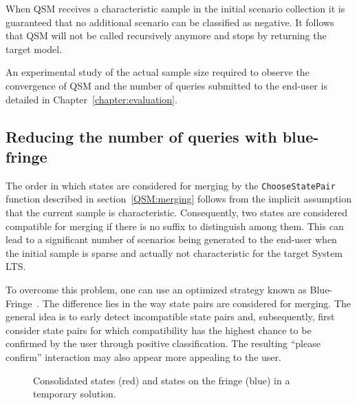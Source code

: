 When QSM receives a characteristic sample in the initial scenario collection it is guaranteed that no additional scenario can be classified as negative. It follows that QSM will not be called recursively anymore and stops by returning the target model. 

An experimental study of the actual sample size required to observe the convergence of \textsc{QSM} and the number of queries submitted to the end-user is detailed in Chapter~\ref{chapter:evaluation}.

\subsection{Reducing the number of queries with blue-fringe\label{BlueFringe}}

The order in which states are considered for merging by the \texttt{ChooseStatePair} function described in section~\ref{QSM:merging} follows from the implicit assumption that the current sample is characteristic. Consequently, two states are considered compatible for merging if there is no suffix to distinguish among them. This can lead to a significant number of scenarios being generated to the end-user when the initial sample is sparse and actually not characteristic for the target System LTS. 

To overcome this problem, one can use an optimized strategy known as Blue-Fringe~\cite{Lang:1998}. The difference lies in the way state pairs are considered for merging. The general idea is to early detect incompatible state pairs and, subsequently, first consider state pairs for which compatibility has the highest chance to be confirmed by the user through positive classification. The resulting ``please confirm'' interaction may also appear more appealing to the user.

\begin{figure}
\hspace*{-1cm}
\vspace*{-.5cm}
\caption{Consolidated states (red) and states on the fringe (blue) in a temporary solution\label{Fig:BlueFringe}.}
\end{figure}

